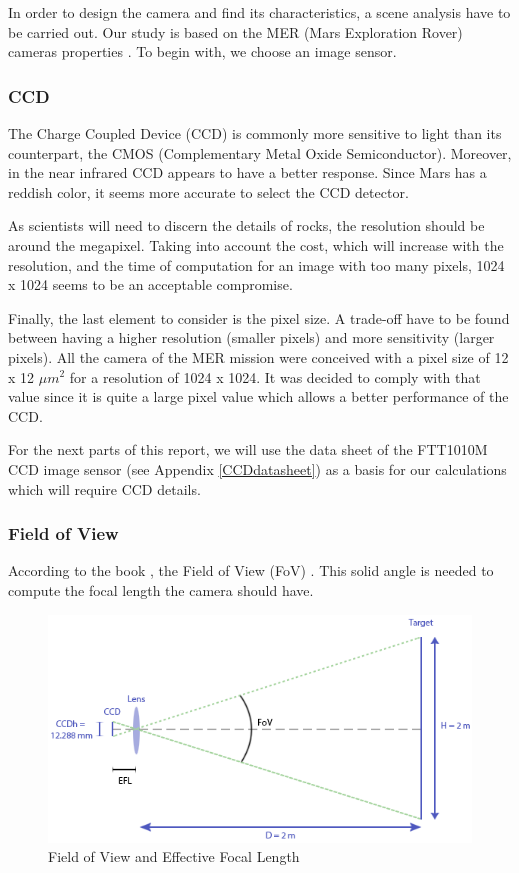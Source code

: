 In order to design the camera and find its characteristics, a scene analysis have to be carried out. Our study is based on the MER (Mars Exploration Rover) cameras properties \cite{merengineeringcameras}.
To begin with, we choose an image sensor. 

\subsubsection{CCD}
\label{fig:CCD}
The Charge Coupled Device (CCD) is commonly more sensitive to light than its counterpart, the CMOS (Complementary Metal Oxide Semiconductor). Moreover, in the near infrared CCD appears to have a better response. Since Mars has a reddish color, it seems more accurate to select the CCD detector.

As scientists will need to discern the details of rocks, the resolution should be around the megapixel. Taking into account the cost, which will increase with the resolution, and the time of computation for an image with too many pixels, 1024 x 1024 seems to be an acceptable compromise.

Finally, the last element to consider is the pixel size. A trade-off have to be found between having a higher resolution (smaller pixels) and more sensitivity (larger pixels). All the camera of the MER mission were conceived with a pixel size of 12 x 12 $\mu m^2$ for a resolution of 1024 x 1024. It was decided to comply with that value since it is quite a large pixel value which allows a better performance of the CCD.

For the next parts of this report, we will use the data sheet of the FTT1010M CCD image sensor (see Appendix \ref{CCDdatasheet}) as a basis for our calculations which will require CCD details.

\subsubsection{Field of View}
According to the book \cite{book}, the Field of View (FoV) . This solid angle is needed to compute the focal length the camera should have.

\begin{figure}[h]
  \centering
  \includegraphics[scale=0.7]{fig/FOV.png}
  \caption{Field of View and Effective Focal Length}
  \label{fig:FOV}
\end{figure}

